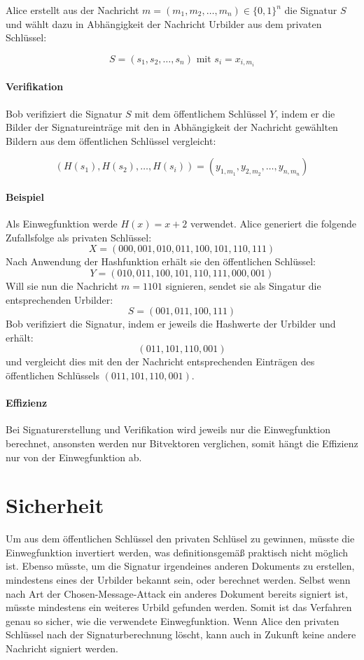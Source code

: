 \documentclass[a4paper,12pt,oneside]{scrreprt}
\begin{document}
Alice erstellt aus der Nachricht $m = (m_1, m_2, \dots, m_n) \in \{0,1\}^n$ die Signatur $S$ und wählt dazu in Abhängigkeit der Nachricht Urbilder aus dem privaten Schlüssel:

\[ S = (s_1, s_2, \dots, s_n) \text{ mit } s_i = x_{i,m_i}\]

\paragraph{Verifikation}

Bob verifiziert die Signatur $S$ mit dem öffentlichem Schlüssel $Y$, indem er die Bilder der Signatureinträge mit den in Abhängigkeit der Nachricht gewählten Bildern aus dem öffentlichen Schlüssel vergleicht: 

\[ (H(s_1),H(s_2),\dots,H(s_i)) = (y_{1,m_1},y_{2,m_2},\dots,y_{n,m_n})\]

\paragraph{Beispiel}

Als Einwegfunktion werde $H(x) = x + 2$ verwendet. Alice generiert die folgende Zufallsfolge als privaten Schlüssel:
\[X = (000,001,010,011,100,101,110,111)\]
Nach Anwendung der Hashfunktion erhält sie den öffentlichen Schlüssel:
\[Y = (010,011,100,101,110,111,000,001)\]
Will sie nun die Nachricht $m = 1101$ signieren, sendet sie als Singatur die entsprechenden Urbilder:
\[S = (001,011,100,111)\]
Bob verifiziert die Signatur, indem er jeweils die Hashwerte der Urbilder und erhält:
\[(011,101,110,001)\]
und vergleicht dies mit den der Nachricht entsprechenden Einträgen des öffentlichen Schlüssels  $(011,101,110,001)$.

\paragraph{Effizienz}

Bei Signaturerstellung und Verifikation wird jeweils nur die Einwegfunktion berechnet, ansonsten werden nur Bitvektoren verglichen, somit hängt die Effizienz nur von der Einwegfunktion ab. 

\section{Sicherheit}

Um aus dem öffentlichen Schlüssel den privaten Schlüsel zu gewinnen, müsste die Einwegfunktion invertiert werden, was definitionsgemäß praktisch nicht möglich ist. Ebenso müsste, um die Signatur irgendeines anderen Dokuments zu erstellen, mindestens eines der Urbilder bekannt sein, oder berechnet werden. Selbst wenn nach Art der Chosen-Message-Attack ein anderes Dokument bereits signiert ist, müsste mindestens ein weiteres Urbild gefunden werden. Somit ist das Verfahren genau so sicher, wie die verwendete Einwegfunktion. Wenn Alice den privaten Schlüssel nach der Signaturberechnung löscht, kann auch in Zukunft keine andere Nachricht signiert werden. 
\end{document}
